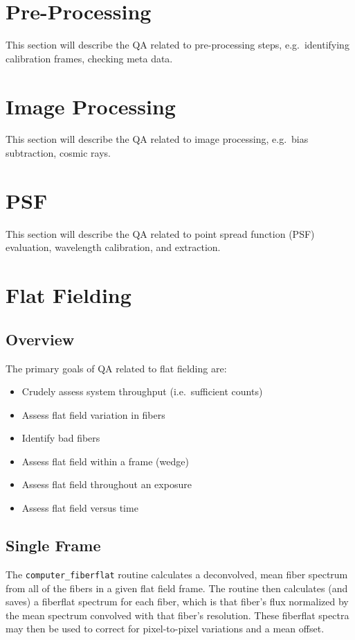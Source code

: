 \documentclass[12pt]{article}
\newenvironment{myitemize}
{ \begin{itemize}
    \setlength{\itemsep}{0pt}
    \setlength{\parskip}{0pt}
    \setlength{\parsep}{0pt}     }
{ \end{itemize}                  }
\begin{document}
\section{Pre-Processing}

This section will describe the QA related to
pre-processing steps, e.g.\ identifying 
calibration frames, checking meta data.

\section{Image Processing}

This section will describe the QA related to
image processing, e.g.\ bias subtraction, 
cosmic rays.

\section{PSF}

This section will describe the QA related to
point spread function (PSF) evaluation, 
wavelength calibration, and extraction.

\section{Flat Fielding}

\subsection{Overview}

The primary goals of QA related to flat fielding are:

\begin{myitemize}
\item Crudely assess system throughput (i.e.\ sufficient counts)
\item Assess flat field variation in fibers
\item Identify bad fibers
\item Assess flat field within a frame (wedge) 
\item Assess flat field throughout an exposure
\item Assess flat field versus time
\end{myitemize}

\subsection{Single Frame}

The {\tt computer\_fiberflat} routine calculates a 
deconvolved, mean fiber spectrum from all of the fibers in a given 
flat field frame. 
The routine then calculates (and saves) a fiberflat spectrum for each 
fiber, which is that fiber's flux normalized by the mean spectrum 
convolved with that fiber's resolution.  These fiberflat spectra
may then be used to correct for pixel-to-pixel variations 
and a mean offset.
\end{document}
